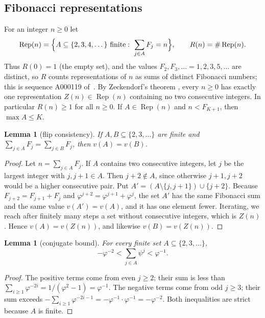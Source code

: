 \documentclass[11pt]{amsart}
\newtheorem{lemma}[theorem]{Lemma}
\theoremstyle{definition}
\theoremstyle{remark}
\numberwithin{equation}{section}
\newcommand{\val}{v}
\newcommand{\Rep}{\operatorname{Rep}}
\begin{document}
\subsection{Fibonacci representations}
For an integer $n\ge0$ let
\[
  \Rep(n)=\Bigl\{A\subseteq\{2,3,4,\dots\}\ \text{finite}:\ \sum_{j\in A}F_j=n\Bigr\},
  \qquad R(n)=\#\Rep(n).
\]
Thus $R(0)=1$ (the empty set), and the values $F_2,F_3,\dots=1,2,3,5,\dots$ are distinct, so $R$
counts representations of $n$ as sums of distinct Fibonacci numbers; this is sequence A000119
of~\cite{OEIS}. By Zeckendorf's theorem \cite{Lekkerkerker1952,Zeckendorf1972}, every $n\ge0$ has
exactly one representation $Z(n)\in\Rep(n)$ containing no two consecutive integers. In particular
$R(n)\ge1$ for all $n\ge 0$. If $A\in\Rep(n)$ and $n<F_{K+1}$, then $\max A\le K$.

\begin{lemma}[flip consistency]\label{lem:flip}
If $A,B\subseteq\{2,3,\dots\}$ are finite and $\sum_{j\in A}F_j=\sum_{j\in B}F_j$, then
$\val(A)=\val(B)$.
\end{lemma}

\begin{proof}
Let $n=\sum_{j\in A}F_j$. If $A$ contains two consecutive integers, let $j$ be the largest integer
with $j,j+1\in A$. Then $j+2\notin A$, since otherwise $j+1,j+2$ would be a higher consecutive pair.
Put $A'=(A\setminus\{j,j+1\})\cup\{j+2\}$. Because $F_{j+2}=F_{j+1}+F_j$ and
$\varphi^{j+2}=\varphi^{j+1}+\varphi^j$, the set $A'$ has the same Fibonacci sum and the same value
$\val(A')=\val(A)$, and it has one element fewer. Iterating, we reach after finitely many steps a set
without consecutive integers, which is $Z(n)$. Hence $\val(A)=\val(Z(n))$, and likewise
$\val(B)=\val(Z(n))$.
\end{proof}

\begin{lemma}[conjugate bound]\label{lem:conjbound}
For every finite set $A\subseteq\{2,3,\dots\}$,
\[
  -\varphi^{-2}<\sum_{j\in A}\psi^j<\varphi^{-1}.
\]
\end{lemma}

\begin{proof}
The positive terms come from even $j\ge2$; their sum is less than
$\sum_{i\ge1}\varphi^{-2i}=1/(\varphi^2-1)=\varphi^{-1}$. The negative terms come from odd $j\ge3$; their
sum exceeds $-\sum_{i\ge1}\varphi^{-2i-1}=-\varphi^{-1}\cdot\varphi^{-1}=-\varphi^{-2}$. Both
inequalities are strict because $A$ is finite.
\end{proof}
\end{document}
